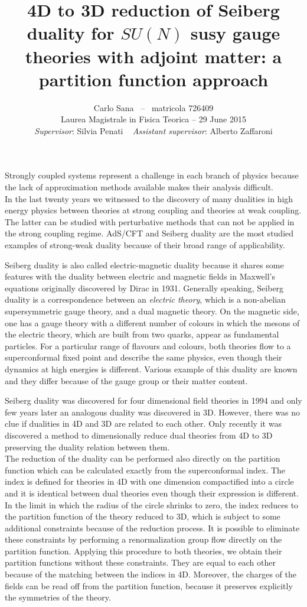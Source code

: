\documentclass[a4paper,12pt]{article}
\author{
 Carlo Sana  ~--~ matricola 726409 \\
 Laurea Magistrale in Fisica Teorica -- 29 June 2015\\
\emph{Supervisor}: Silvia Penati 
~
\emph{Assistant supervisor}: Alberto Zaffaroni\\
}
\date{}
\title{ \textbf{4D to 3D reduction of Seiberg duality for $SU(N)$ susy gauge theories with adjoint matter: a partition function approach }}
\begin{document}
\maketitle
Strongly coupled systems represent a challenge in each branch of physics because the lack of approximation methods available makes their analysis difficult.\\
In the last twenty years we witnessed to the discovery of many dualities in high energy physics between theories at strong coupling and theories at weak coupling.
The latter can be studied with perturbative methods that can not be applied in the strong coupling regime.
AdS/CFT and Seiberg duality are the most studied examples of strong-weak duality because of their broad range of applicability.

Seiberg duality is also called electric-magnetic duality because it shares some features with the duality between electric and magnetic fields in Maxwell's equations originally discovered by Dirac in 1931.
Generally speaking, Seiberg duality is a correspondence between an \emph{electric theory}, which is a non-abelian supersymmetric gauge theory, and a dual magnetic theory. 
On the magnetic side, one has a gauge theory with a different number of colours  in which the mesons of the electric theory, which are built from two quarks, appear as fundamental particles.
For a particular range of flavours and colours, both theories flow to a superconformal fixed point and describe the same physics, even though their dynamics at high energies is different.
Various example of this duality are known and they differ because of the gauge group or their matter content.

Seiberg duality was discovered for four dimensional field theories in 1994 and only few years later an analogous duality was discovered in 3D.
However, there was no clue if dualities in 4D and 3D are related to each other.
Only recently it was discovered a method to dimensionally reduce dual theories from 4D to 3D preserving the duality relation between them.\\
The reduction of the duality can be performed also directly on the partition function which can be calculated exactly from the superconformal index. 
The index is defined for theories in 4D with one dimension compactified into a circle and it is identical between dual theories even though their expression is different.
In the limit in which the radius of the circle shrinks to zero, the index reduces to the partition function of the theory reduced to 3D, which is subject to some additional constraints because of the reduction process.
It is possible to eliminate these constraints by performing a renormalization group flow directly on the partition function.
Applying this procedure to both theories, we obtain their partition functions without these constraints. 
They are equal to each other because of the matching between the indices in 4D.
Moreover, the charges of the fields can be read off from the partition function, because it preserves explicitly the symmetries of the theory.
\end{document}
